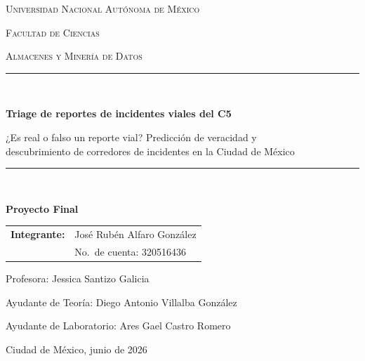 \documentclass[11pt,letterpaper]{article}
\begin{document}
\begin{titlepage}
\centering
\vspace*{1.5cm}
{\scshape\large Universidad Nacional Autónoma de México\par}
{\scshape Facultad de Ciencias\par}
\vspace{0.5cm}
{\scshape Almacenes y Minería de Datos\par}
\vspace{2.5cm}

\rule{\linewidth}{0.4pt}\\[0.4cm]
{\huge\bfseries Triage de reportes de incidentes viales del C5\par}
\vspace{0.3cm}
{\Large ¿Es real o falso un reporte vial? Predicción de veracidad y\\
descubrimiento de corredores de incidentes en la Ciudad de México\par}
\rule{\linewidth}{0.4pt}\\[1.5cm]

{\large\bfseries Proyecto Final\par}
\vspace{2cm}

{\large
\begin{tabular}{ll}
\textbf{Integrante:} & José Rubén Alfaro González\\
                     & No.\ de cuenta: 320516436\\
\end{tabular}\par}

\vspace{1.5cm}
{\large Profesora: Jessica Santizo Galicia\par}
{\normalsize Ayudante de Teoría: Diego Antonio Villalba González\par}
{\normalsize Ayudante de Laboratorio: Ares Gael Castro Romero\par}

\vfill
{\large Ciudad de México, junio de 2026\par}
\end{titlepage}

\tableofcontents
\newpage

\end{document}
